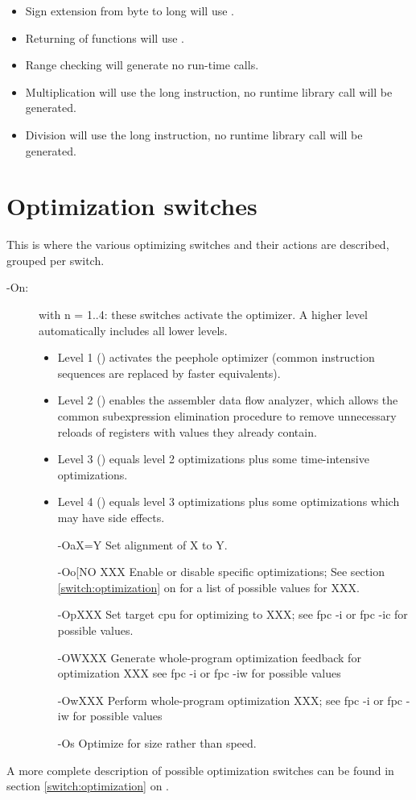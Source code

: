 \begin{itemize}
\item Sign extension from byte to long will use .
\item Returning of functions will use .
\item Range checking will generate no run-time calls.
\item Multiplication will use the long  instruction, no
runtime library call will be generated.
\item Division will use the long  instruction, no
runtime library call will be generated.
\end{itemize}

\section{Optimization switches}
This is where the various optimizing switches and their actions are
described, grouped per switch.

\begin{description}
\item [-On:\ ] with n = 1..4: these switches activate the optimizer.
A higher level automatically includes all lower levels.
\begin{itemize}
\item Level 1 () activates the peephole optimizer
 (common instruction sequences are replaced by faster equivalents).
\item Level 2 () enables the assembler data flow analyzer,
which allows the common subexpression elimination procedure to
remove unnecessary reloads of registers with values they already contain.
\item Level 3 () equals level 2 optimizations plus some
time-intensive optimizations.
\item Level 4 () equals level 3 optimizations plus some
optimizations which may have side effects.
\item[-OaX=Y] Set alignment of X to Y.
\item[-Oo[NO]XXX Enable or disable specific optimizations; See section \ref{switch:optimization}
on \pageref{switch:optimization} for a list of possible values for XXX.
\item[-OpXXX] Set target cpu for optimizing to XXX; see fpc -i or fpc -ic for possible values.
\item[-OWXXX] Generate whole-program optimization feedback for optimization XXX see fpc -i or fpc -iw for possible values
\item[-OwXXX] Perform whole-program optimization XXX; see fpc -i or fpc -iw for possible values
\item[-Os] Optimize for size rather than speed.
\end{itemize}
\end{description}
A more complete description of possible optimization switches can be found
in section \ref{switch:optimization} on \pageref{switch:optimization}.

